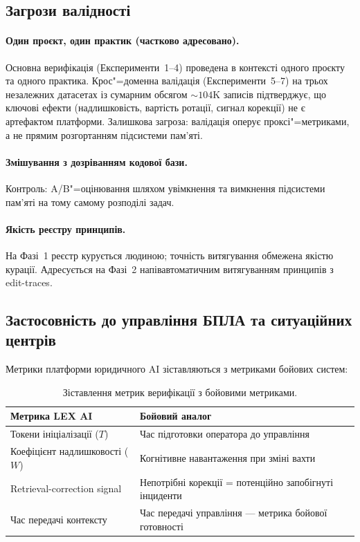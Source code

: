 \documentclass[11pt]{article}
\begin{document}
\subsection{Загрози валідності}
\label{sec:threats}

\paragraph{Один проєкт, один практик (частково адресовано).}
Основна верифікація (Експерименти~1--4) проведена в контексті одного проєкту та одного практика.
Крос"=доменна валідація (Експерименти~5--7) на трьох незалежних датасетах із сумарним обсягом ${\sim}104$K записів підтверджує, що ключові ефекти (надлишковість, вартість ротації, сигнал корекції) не є артефактом платформи.
Залишкова загроза: валідація оперує проксі"=метриками, а не прямим розгортанням підсистеми пам'яті.

\paragraph{Змішування з дозріванням кодової бази.}
Контроль: A/B"=оцінювання шляхом увімкнення та вимкнення підсистеми пам'яті на тому самому розподілі задач.

\paragraph{Якість реєстру принципів.}
На Фазі~1 реєстр курується людиною; точність витягування обмежена якістю курації.
Адресується на Фазі~2 напівавтоматичним витягуванням принципів з edit-traces.

\subsection{Застосовність до управління БПЛА та ситуаційних центрів}
\label{sec:metrics-mapping}

Метрики платформи юридичного AI зіставляються з метриками бойових систем:

\begin{table}[ht]
\centering
\caption{Зіставлення метрик верифікації з бойовими метриками.}
\label{tab:metrics-mapping}
\begin{tabular}{@{}p{5.5cm}p{5.5cm}@{}}
\toprule
\textbf{Метрика LEX AI} & \textbf{Бойовий аналог} \\
\midrule
Токени ініціалізації ($T$) & Час підготовки оператора до управління \\
Коефіцієнт надлишковості ($W$) & Когнітивне навантаження при зміні вахти \\
Retrieval-correction signal & Непотрібні корекції = потенційно запобігнуті інциденти \\
Час передачі контексту & Час передачі управління --- метрика бойової готовності \\
\bottomrule
\end{tabular}
\end{table}
\end{document}
